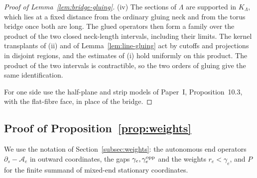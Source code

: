 \documentclass[11pt]{amsart}
\theoremstyle{definition}
\theoremstyle{remark}
\theoremstyle{plain}
\numberwithin{equation}{section}
\begin{document}
\begin{proof}[Proof of Lemma~\ref{lem:bridge-gluing}]
(iv) The sections of $\Lambda$ are supported in $K_\Lambda$, which lies at
a fixed distance from the ordinary gluing neck and from the torus bridge
once both are long. The glued operators then form a family over the
product of the two closed neck-length intervals, including their limits.
The kernel transplants of (ii) and of Lemma~\ref{lem:line-gluing} act by
cutoffs and projections in disjoint regions, and the estimates of (i) hold
uniformly on this product. The product of the two intervals is
contractible, so the two orders of gluing give the same identification.

For one side use the half-plane and strip models of Paper~I,
Proposition~10.3, with the flat-fibre face, in place of the bridge.
\end{proof}

\subsection{Proof of Proposition~\ref{prop:weights}}\label{app:weights}
We use the notation of Section~\ref{subsec:weights}: the autonomous end
operators $\partial_s-\mathcal A_e$ in outward coordinates, the gaps
$\gamma_e,\gamma_e^{\rm opp}$ and the weights $r_e<\gamma_e$, and $P$ for the finite summand of mixed-end stationary coordinates.
\end{document}
